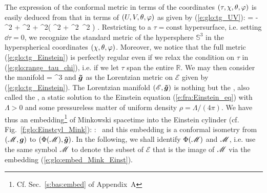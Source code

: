 The expression of the conformal metric in terms of the coordinates
$(\tau,\chi,\theta,\varphi)$ is easily deduced from that in terms of
$(U,V,\theta,\varphi)$ as given by (\ref{e:glo:tg_UV}):
\be \label{e:glo:tg_Einstein}
     =  - \dd\tau^2
        + \dd \chi^2
        + \sin^2\chi \left(  \dd\th^2 + \sin^2\th \, \dd\ph^2 \right) .
\ee
Restricting to a $\tau = \mathrm{const}$ hypersurface, i.e. setting $\dd\tau=0$,
we recognize the standard metric of the hypersphere
$\mathbb{S}^3$ in the hyperspherical coordinates $(\chi,\theta,\varphi)$.
Moreover, we notice that the full metric (\ref{e:glo:tg_Einstein})
is perfectly regular even if we relax
the condition on $\tau$ in (\ref{e:glo:range_tau_chi}), i.e. if we
let $\tau$ span the
entire $\mathbb{R}$. We may then consider the manifold
\be
     = \times {}^3
\ee
and $\bm{\tilde{g}}$ as the Lorentzian metric on $\mathscr{E}$ given by
(\ref{e:glo:tg_Einstein}).
The Lorentzian manifold
$(\mathscr{E},\bm{\tilde{g}})$ is nothing but the
, also called the ,
a static solution to the Einstein equation (\ref{e:fra:Einstein_eq})
with $\Lambda > 0$ and some pressureless matter of uniform density
$\rho = \Lambda/(4\pi)$.
We have thus an embedding\footnote{Cf. Sec.~\ref{s:bas:embed} of Appendix~A} of Minkowski spacetime into the Einstein cylinder (cf. Fig.~\ref{f:glo:Einstcyl_Mink}):
\be \label{e:glo:embed_Mink_Einst}
     \Phi:\ \M \longrightarrow {}
\ee
and this embedding is a conformal isometry from
$(\mathscr{M},\bm{g})$ to $(\Phi(\mathscr{M}),\bm{\tilde{g}})$.
In the following, we shall identify $\Phi(\mathscr{M})$ and $\mathscr{M}$, i.e. use the same
symbol $\mathscr{M}$ to denote the subset of $\mathscr{E}$ that is the image of $\mathscr{M}$ via the
embedding (\ref{e:glo:embed_Mink_Einst}).

